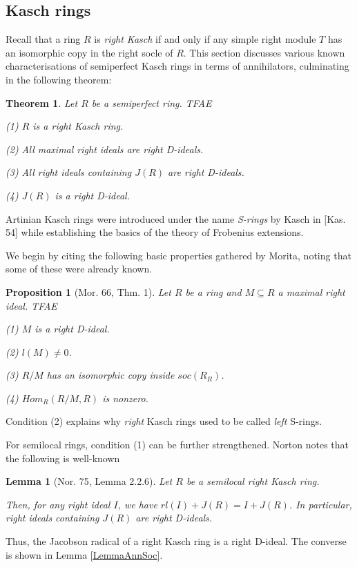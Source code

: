 \documentclass[11pt]{article}
\theoremstyle{plain}
\newtheorem{Lemma}[veta]{Lemma}
\newtheorem{Thm}[veta]{Theorem}
\newtheorem{Prop}[veta]{Proposition}
\theoremstyle{remark}
\theoremstyle{plain}
\begin{document}
\subsection{Kasch rings}\label{SecDKasch}

Recall that a ring $R$ is \textit{right Kasch} if and only if any simple right module $T$ has an isomorphic copy in the right socle of $R$.  This section discusses various known characterisations of semiperfect Kasch rings in terms of annihilators, culminating in the following theorem:

\begin{Thm}\label{ThmKasch}Let $R$ be a semiperfect ring. TFAE

(1) $R$ is a right Kasch ring. 

(2) All maximal right ideals are right D-ideals.

(3) All right ideals containing $J(R)$ are right D-ideals.

(4) $J(R)$ is a right D-ideal.     
\end{Thm}
Artinian Kasch rings were introduced under the name \textit{S-rings} by Kasch in [Kas. 54] while establishing the basics of the
theory of Frobenius extensions. 

We begin by citing the following basic properties gathered by Morita, noting that some of these were already known.
\begin{Prop}[Mor. 66, Thm. 1]\label{PropKasch}
    Let $R$ be a ring and $M\subseteq R$ a maximal right ideal. TFAE

    (1) $M$ is a right D-ideal.

    (2) $l(M)\neq 0$.

    (3) $R/M$ has an isomorphic copy inside $soc(R_R)$.

    (4) $Hom_R(R/M,  R)$ is nonzero.
\end{Prop}
Condition (2) explains why \textit{right} Kasch rings used to be called \textit{left} S-rings.

 For semilocal rings, condition (1) can be further strengthened. Norton notes that the following is well-known
\begin{Lemma}[Nor. 75, Lemma 2.2.6]\label{LemmaAboveJ}
    Let $R$ be a semilocal right Kasch ring.

 Then, for any right ideal $I$, we have $rl(I)+J(R)=I+J(R)$. In particular, right ideals containing $J(R)$ are right D-ideals.
    \end{Lemma}
  Thus, the Jacobson radical of a right Kasch ring is a right D-ideal. The converse is shown in Lemma \ref{LemmaAnnSoc}.
    
\end{document}
